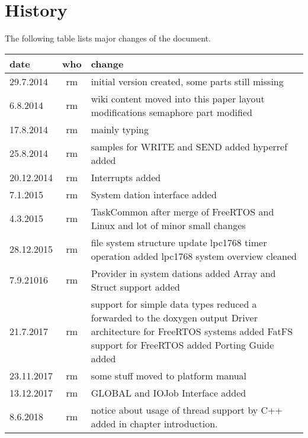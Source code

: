 \chapter*{History}
The following table lists major changes of the document.

\begin{tabular}{|l|c|p{10cm}|}
\hline
date & who & change \\
\hline
29.7.2014 & rm & initial version created, some parts still missing \\
6.8.2014 & rm & wiki content moved into this paper \newline
                layout modifications\newline
                semaphore part modified\\
17.8.2014 & rm & mainly typing \\
25.8.2014 & rm & samples for WRITE and SEND added \newline
		 hyperref added\\
20.12.2014 & rm & Interrupts added \\
7.1.2015 & rm & System dation interface added \\
4.3.2015 & rm &  TaskCommon after merge of FreeRTOS and Linux \newline
and lot of minor small changes \\
28.12.2015 & rm & file system structure update \newline
                  lpc1768 timer operation added \newline
                  lpc1768 system overview cleaned \\
7.9.21016 & rm & Provider in system dations added\newline
                 Array and Struct support added\\
21.7.2017 & rm & support for simple data types reduced
                 a forwarded to the doxygen output \newline
                 Driver architecture for FreeRTOS systems added \newline
                 FatFS support for FreeRTOS added \newline
                 Porting Guide added \\
23.11.2017 & rm & some stuff moved to platform manual\\
13.12.2017 & rm & GLOBAL and IOJob Interface added \\
8.6.2018 & rm & notice about usage of thread support by C++ added in chapter
                introduction.\\
\hline
\end{tabular} 
